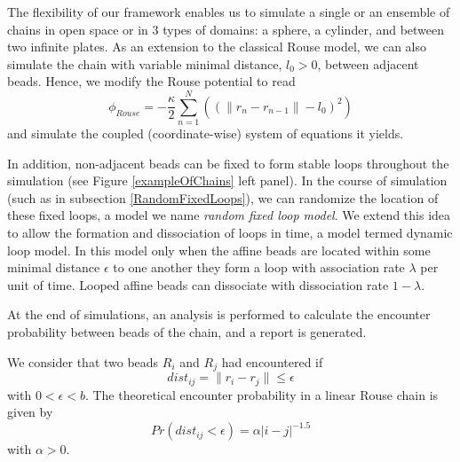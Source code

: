 \documentclass[12pt]{paper}
\begin{document}
The flexibility of our framework enables us to simulate a single or an ensemble of chains in open space or in 3 types of domains: a sphere, a cylinder, and between two infinite plates. As an extension to the classical Rouse model, we can also simulate the chain with variable minimal distance, $l_0>0$, between adjacent beads. Hence, we modify the Rouse potential to read
\begin{equation*}
\phi_{Rouse}=-\frac{\kappa}{2}\sum_{n=1}^N\left((\|r_n-r_{n-1}\|-l_0)^2\right)
\end{equation*}
and simulate the coupled (coordinate-wise) system of equations it yields.

In addition, non-adjacent beads can be fixed to form stable loops throughout the simulation (see Figure \ref{exampleOfChains} left panel). In the course of simulation (such as in subsection \ref{RandomFixedLoops}), we can randomize the location of these fixed loops, a model we name \textit{random fixed loop model}. We extend this idea to allow the formation and dissociation of loops in time, a model termed dynamic loop model. In this model only when the affine beads are located within some minimal distance $\epsilon$ to one another they form a loop with association rate $\lambda$ per unit of time. Looped affine beads can dissociate with dissociation rate $1-\lambda$.

At the end of simulations, an analysis is performed to calculate the encounter probability between beads of the chain, and a report is generated.  

We consider that two beads $R_i$ and $R_j$ had encountered if
\begin{equation*}
 dist_{ij}=\|r_i-r_j\|\leq \epsilon
\end{equation*}
with $0<\epsilon <b$. The theoretical encounter probability in a linear Rouse chain is given by 
\begin{equation}
Pr(dist_{ij}<\epsilon)= \alpha |i-j|^{-1.5}
\end{equation}
with $\alpha>0$. 
\end{document}
